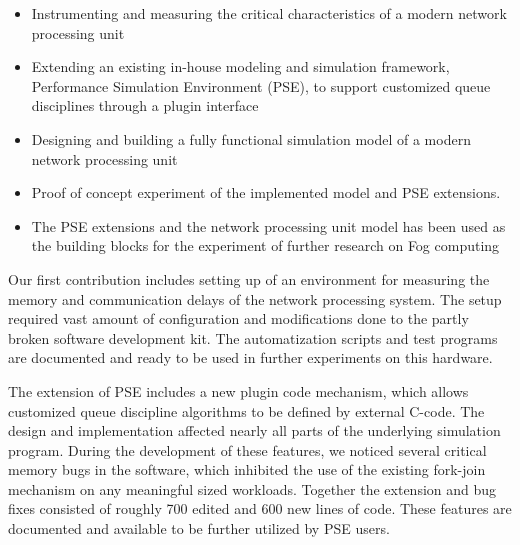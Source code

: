 \begin{itemize}
\item Instrumenting and measuring the critical characteristics of a modern network processing unit
\item Extending an existing in-house modeling and simulation framework, Performance Simulation Environment (PSE), to support customized queue disciplines through a plugin interface %
\item Designing and building a fully functional simulation model of a modern network processing unit

\item Proof of concept experiment of the implemented model and PSE extensions.

\item The PSE extensions and the network processing unit model has been used as the building blocks for the experiment of further research on Fog computing
\end{itemize}


Our first contribution includes setting up of an environment for measuring the memory and communication delays of the network processing system. The setup required vast amount of configuration and modifications done to the partly broken software development kit. The automatization scripts and test programs are documented and ready to be used in further experiments on this hardware.

The extension of PSE includes a new plugin code mechanism, which allows customized queue discipline algorithms to be defined by external C-code. The design and implementation affected nearly all parts of the underlying simulation program. During the development of these features, we noticed several critical memory bugs in the software, which inhibited the use of the existing fork-join mechanism on any meaningful sized workloads. Together the extension and bug fixes consisted of roughly 700 edited and 600 new lines of code. These features are documented and available to be further utilized by PSE users.

